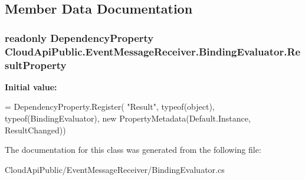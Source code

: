 \subsection{Member Data Documentation}
\hypertarget{class_cloud_api_public_1_1_event_message_receiver_1_1_binding_evaluator_ae1fff27340b14df912170510f645b4e0}{
\subsubsection[{Result\-Property}]{\setlength{\rightskip}{0pt plus 5cm}readonly Dependency\-Property Cloud\-Api\-Public.\-Event\-Message\-Receiver.\-Binding\-Evaluator.\-Result\-Property\hspace{0.3cm}{\ttfamily [static]}}}\label{class_cloud_api_public_1_1_event_message_receiver_1_1_binding_evaluator_ae1fff27340b14df912170510f645b4e0}
{\bfseries Initial value\-:}
\begin{DoxyCode}
= DependencyProperty.Register(
            \textcolor{stringliteral}{"Result"}, typeof(\textcolor{keywordtype}{object}), typeof(BindingEvaluator), \textcolor{keyword}{new} PropertyMetadata(Default.Instance, 
      ResultChanged))
\end{DoxyCode}


The documentation for this class was generated from the following file\-:\begin{DoxyCompactItemize}
\item 
Cloud\-Api\-Public/\-Event\-Message\-Receiver/Binding\-Evaluator.\-cs\end{DoxyCompactItemize}
